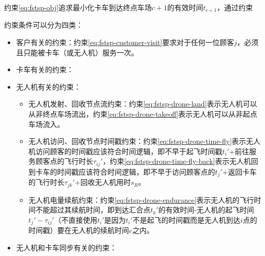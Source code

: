 约束\ref{eq:fstsp-obj}追求最小化卡车到达终点车场$c+1$的有效时间$t_{c+1}$，通过约束

约束条件可以分为四类\cite{zhihu-murray2015}：

\begin{itemize}
    \item \colorbox{shallow-green}{客户有关的约束：}约束\ref{eq:fstsp-customer-visit}要求对于任何一位顾客$j$，必须且只能被卡车（或无人机）服务一次。
    \item \colorbox{shallow-purple}{卡车有关的约束：}
    \item \colorbox{shallow-red}{无人机有关的约束：}
    \begin{itemize}
        \item 无人机发射、回收节点流约束：约束\ref{eq:fstsp-drone-land}表示无人机可以从非终点车场流出，约束\ref{eq:fstsp-drone-takeoff}表示无人机可以从非起点车场流入。
        \item 无人机访问、回收节点时间戳约束：约束\ref{eq:fstsp-drone-time-fly}表示无人机访问顾客的时间戳应该符合时间逻辑，即不早于起飞时间戳$t_i'$+前往服务顾客点的飞行时长$\tau_{ij}'$，约束\ref{eq:fstsp-drone-time-fly-back}表示无人机回到卡车的时间戳应该符合时间逻辑，即不早于访问顾客点的$t_j'$+返回卡车的飞行时长$\tau_{jk}'$+回收无人机用时$s_R$。
        \item 无人机电量续航约束：约束\ref{eq:fstsp-drone-endurance}表示无人机的飞行时间不能超过其续航时间，即到达汇合点$t_k'$的有效时间-无人机的起飞时间$t_j'-\tau_{ij}'$（不直接使用$t_i'$是因为$t_i'$不是起飞的时间戳而是无人机到达$i$点的时间戳）要在无人机的续航时间$e$之内。
    \end{itemize}
    \item \colorbox{shallow-yellow}{无人机和卡车同步有关的约束：}

\end{itemize}
